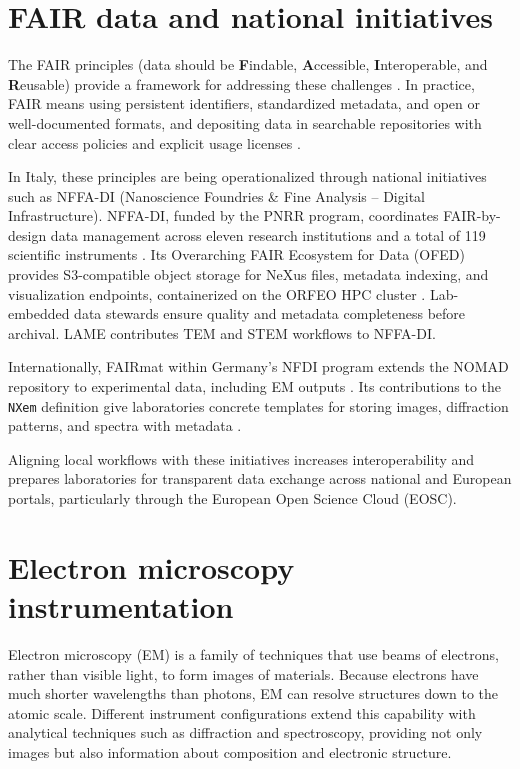 \section{FAIR data and national initiatives}\label{sec:nffa-di}

The FAIR principles (data should be \textbf{F}indable, \textbf{A}ccessible, \textbf{I}nteroperable, and \textbf{R}eusable) provide a framework for addressing these challenges \parencite{Wilkinson2016FAIR,GOFAIRPrinciples}. 
In practice, FAIR means using persistent identifiers, standardized metadata, and open or well-documented formats, and depositing data in searchable repositories with clear access policies and explicit usage licenses \parencite{EC2018TurningFAIR,EC2021HEGuide}. 

In Italy, these principles are being operationalized through national initiatives such as NFFA-DI (Nanoscience Foundries \& Fine Analysis – Digital Infrastructure). 
NFFA-DI, funded by the PNRR program, coordinates FAIR-by-design data management across eleven research institutions and a total of 119 scientific instruments \parencite{nffamaster2024}. 
Its Overarching FAIR Ecosystem for Data (OFED) provides S3-compatible object storage for NeXus files, metadata indexing, and visualization endpoints, containerized on the ORFEO HPC cluster \parencite{ofedslides}. 
Lab-embedded data stewards ensure quality and metadata completeness before archival. 
LAME contributes TEM and STEM workflows to NFFA-DI.

Internationally, FAIRmat within Germany’s NFDI program extends the NOMAD repository to experimental data, including EM outputs \parencite{fairmatPortal}. 
Its contributions to the \texttt{NXem} definition give laboratories concrete templates for storing images, diffraction patterns, and spectra with metadata \parencite{fairmathdf5}. 

Aligning local workflows with these initiatives increases interoperability and prepares laboratories for transparent data exchange across national and European portals, particularly through the European Open Science Cloud (EOSC). 


\section{Electron microscopy instrumentation}

Electron microscopy (EM) is a family of techniques that use beams of electrons, rather than visible light, to form images of materials. 
Because electrons have much shorter wavelengths than photons, EM can resolve structures down to the atomic scale. 
Different instrument configurations extend this capability with analytical techniques such as diffraction and spectroscopy, providing not only images but also information about composition and electronic structure.  

